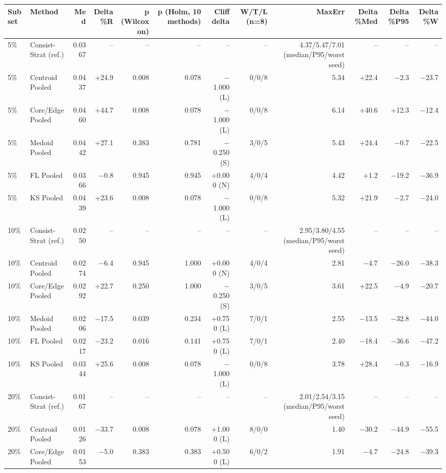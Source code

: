 \begin{tabular}{llrrrrrrrrrr}
\toprule
Subset & Method & Med & Delta\%R & p (Wilcoxon) & p (Holm, 10 methods) & Cliff delta & W/T/L (n=8) & MaxErr & Delta\%Med & Delta\%P95 & Delta\%W \\
\midrule
5\% & Consist-Strat (ref.) & 0.0367 & -- & -- & -- & -- & -- & 4.37/5.47/7.01 (median/P95/worst seed) & -- & -- & -- \\
5\% & Centroid Pooled & 0.0437 & +24.9 & 0.008 & 0.078 & $-$1.000 (L) & 0/0/8 & 5.34 & +22.4 & $-$2.3 & $-$23.7 \\
5\% & Core/Edge Pooled & 0.0460 & +44.7 & 0.008 & 0.078 & $-$1.000 (L) & 0/0/8 & 6.14 & +40.6 & +12.3 & $-$12.4 \\
5\% & Medoid Pooled & 0.0442 & +27.1 & 0.383 & 0.781 & $-$0.250 (S) & 3/0/5 & 5.43 & +24.4 & $-$0.7 & $-$22.5 \\
5\% & FL Pooled & 0.0366 & $-$0.8 & 0.945 & 0.945 & +0.000 (N) & 4/0/4 & 4.42 & +1.2 & $-$19.2 & $-$36.9 \\
5\% & KS Pooled & 0.0439 & +23.6 & 0.008 & 0.078 & $-$1.000 (L) & 0/0/8 & 5.32 & +21.9 & $-$2.7 & $-$24.0 \\
10\% & Consist-Strat (ref.) & 0.0250 & -- & -- & -- & -- & -- & 2.95/3.80/4.55 (median/P95/worst seed) & -- & -- & -- \\
10\% & Centroid Pooled & 0.0274 & $-$6.4 & 0.945 & 1.000 & +0.000 (N) & 4/0/4 & 2.81 & $-$4.7 & $-$26.0 & $-$38.3 \\
10\% & Core/Edge Pooled & 0.0292 & +22.7 & 0.250 & 1.000 & $-$0.250 (S) & 3/0/5 & 3.61 & +22.5 & $-$4.9 & $-$20.7 \\
10\% & Medoid Pooled & 0.0206 & $-$17.5 & 0.039 & 0.234 & +0.750 (L) & 7/0/1 & 2.55 & $-$13.5 & $-$32.8 & $-$44.0 \\
10\% & FL Pooled & 0.0217 & $-$23.2 & 0.016 & 0.141 & +0.750 (L) & 7/0/1 & 2.40 & $-$18.4 & $-$36.6 & $-$47.2 \\
10\% & KS Pooled & 0.0344 & +25.6 & 0.008 & 0.078 & $-$1.000 (L) & 0/0/8 & 3.78 & +28.4 & $-$0.3 & $-$16.9 \\
20\% & Consist-Strat (ref.) & 0.0167 & -- & -- & -- & -- & -- & 2.01/2.54/3.15 (median/P95/worst seed) & -- & -- & -- \\
20\% & Centroid Pooled & 0.0126 & $-$33.7 & 0.008 & 0.078 & +1.000 (L) & 8/0/0 & 1.40 & $-$30.2 & $-$44.9 & $-$55.5 \\
20\% & Core/Edge Pooled & 0.0153 & $-$5.0 & 0.383 & 0.383 & +0.500 (L) & 6/0/2 & 1.91 & $-$4.7 & $-$24.8 & $-$39.3 \\

\end{tabular}
